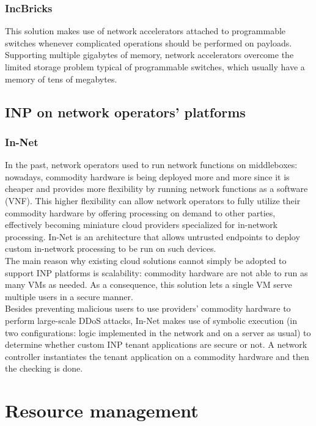 \documentclass[a4paper, 11pt]{article}
\begin{document}
\subsubsection{IncBricks \cite{incbricks}}
This solution makes use of network accelerators attached to programmable switches whenever complicated operations should be performed on payloads.\\
Supporting multiple gigabytes of memory, network accelerators overcome the limited storage problem typical of programmable switches, which usually have a memory of tens of megabytes.

\subsection{INP on network operators' platforms}
\subsubsection{In-Net \cite{in-net}}
In the past, network operators used to run network functions on middleboxes: nowadays, commodity hardware is being deployed more and more since it is cheaper and provides more flexibility by running network functions as a software (VNF). This higher flexibility can allow network operators to fully utilize their commodity hardware by offering processing on demand to other parties, effectively becoming miniature cloud providers specialized for in-network processing. In-Net \cite{in-net} is an architecture that allows untrusted endpoints to deploy custom in-network processing to be run on such devices.\\
The main reason why existing cloud solutions cannot simply be adopted to support INP platforms is scalability: commodity hardware are not able to run as many VMs as needed. As a consequence, this solution lets a single VM serve multiple users in a secure manner.\\
Besides preventing malicious users to use providers' commodity hardware to perform large-scale DDoS attacks, In-Net \cite{in-net} makes use of symbolic execution (in two configurations: logic implemented in the network and on a server as usual) to determine whether custom INP tenant applications are secure or not. A network controller instantiates the tenant application on a commodity hardware and then the checking is done.

\section{Resource management}
\end{document}
